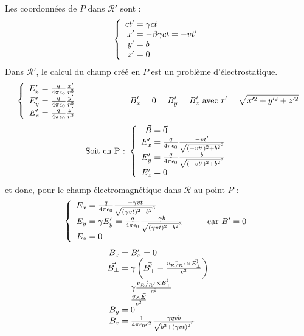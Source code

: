 \begin{app}
Les coordonnées de $P$ dans $\mathcal{R'}$ sont :
{\renewcommand*{\arraystretch}{1.2}$$
	\left\{ \begin{array}{r@{\;}l}
		ct'&=\gamma ct\\
		x'&=-\beta\gamma ct=-vt'\\
		y'&=b\\
		z'&=0
	\end{array} \right.
$$}
Dans $\mathcal{R'}$, le calcul du champ créé en $P$ est un problème d'électrostatique.
$$
	\left\{ \begin{array}{r@{\;}l}
		E'_x&=\frac{q}{4\pi\epsilon_0}\frac{x'}{r^3}\\
		E'_y&=\frac{q}{4\pi\epsilon_0}\frac{y'}{r^3}\\
		E'_z&=\frac{q}{4\pi\epsilon_0}\frac{z'}{r^3}
	\end{array} \right.	
	\kern 2cm B'_x=0=B'_y=B'_z\text{ avec }r'=\sqrt{x'^2+y'^2+z'^2}
$$
$$
	\text{Soit en P : }\left\{ \begin{array}{r@{\;}l}
		\vec{B}&=\vec{0}\\
		E'_x&=\frac{q}{4\pi\epsilon_0}\frac{-vt'}{\sqrt{(-vt')^2+b^2}^3}\\
		E'_y&=\frac{q}{4\pi\epsilon_0}\frac{b}{\sqrt{(-vt')^2+b^2}^3}\\
		E'_z&=0
	\end{array} \right.
$$
et donc, pour le champ électromagnétique dans $\mathcal{R}$ au point $P$ :
$$
	\left\{ \begin{array}{r@{\;}l}
		E_x&=\frac{q}{4\pi\epsilon_0}\frac{-\gamma vt}{\sqrt{(\gamma vt)^2+b^2}^3}\\
		E_y&=\gamma E'_y=\frac{q}{4\pi\epsilon_0}\frac{\gamma b}{\sqrt{(\gamma vt)^2+b^2}^3}\kern 1cm \text{car }B'=0\\
		E_z&=0
	\end{array} \right.	
$$
$$
	\begin{array}{r@{\;}l}
		B_x&=B'_x=0\\
		\vec{B_{\perp}}&=\gamma\left(\vec{B'_{\perp}}-\frac{\vec{ v_{\mathcal{R}/\mathcal{R'}}}\times\vec{E'_{\perp}}}{c^2}\right)\\
		&=\gamma\frac{\vec{ v_{\mathcal{R}/\mathcal{R'}}}\times\vec{E'_{\perp}}}{c^2}\\
		&=\frac{\vec{v}\times\vec{E}}{c^2}\\
		B_y&=0\\
		B_z&=\frac{1}{4\pi\epsilon_0 c^2}\frac{\gamma qvb}{\sqrt{b^2+(\gamma vt)^2}^3}
	\end{array}
$$
\end{app}
